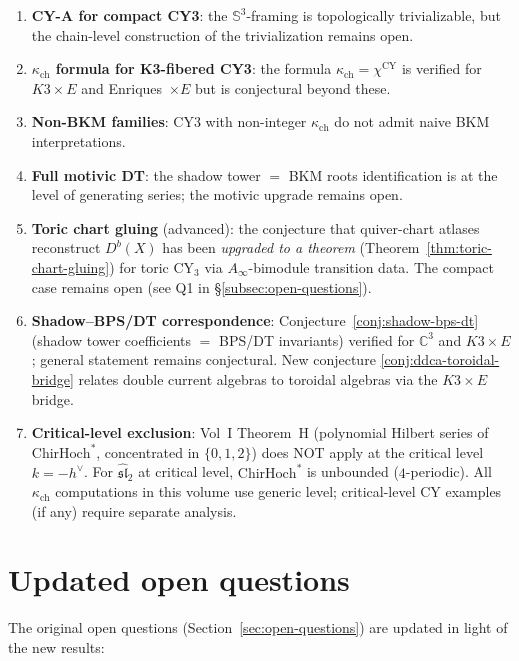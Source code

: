 \documentclass[11pt]{article}
\newcommand{\fsl}{\mathfrak{sl}}
\newcommand{\C}{\mathbb{C}}
\newcommand{\bS}{\mathbb{S}}
\newcommand{\CY}{\mathrm{CY}}
\newcommand{\ChirHoch}{\mathrm{ChirHoch}}
\begin{document}
\begin{enumerate}
 \item \textbf{CY-A for compact CY3}: the $\bS^3$-framing is topologically trivializable, but the chain-level construction of the trivialization remains open.
 \item \textbf{$\kappa_{\mathrm{ch}}$ formula for K3-fibered CY3}: the formula $\kappa_{\mathrm{ch}} = \chi^{\CY}$ is verified for $K3 \times E$ and Enriques~$\times E$ but is conjectural beyond these.
 \item \textbf{Non-BKM families}: CY3 with non-integer $\kappa_{\mathrm{ch}}$ do not admit naive BKM interpretations.
 \item \textbf{Full motivic DT}: the shadow tower $=$ BKM roots identification is at the level of generating series; the motivic upgrade remains open.
 \item \textbf{Toric chart gluing} (advanced): the conjecture that quiver-chart atlases reconstruct $D^b(X)$ has been \emph{upgraded to a theorem} (Theorem~\ref{thm:toric-chart-gluing}) for toric CY$_3$ via $A_\infty$-bimodule transition data. The compact case remains open (see Q1 in \S\ref{subsec:open-questions}).
 \item \textbf{Shadow--BPS/DT correspondence}: Conjecture~\ref{conj:shadow-bps-dt} (shadow tower coefficients $=$ BPS/DT invariants) verified for $\C^3$ and $K3 \times E$; general statement remains conjectural. New conjecture \ref{conj:ddca-toroidal-bridge} relates double current algebras to toroidal algebras via the $K3 \times E$ bridge.
 \item \textbf{Critical-level exclusion}: Vol~I Theorem~H (polynomial Hilbert series of $\ChirHoch^*$, concentrated in $\{0,1,2\}$) does NOT apply at the critical level $k = -h^\vee$. For $\widehat{\fsl}_2$ at critical level, $\ChirHoch^*$ is unbounded ($4$-periodic). All $\kappa_{\mathrm{ch}}$ computations in this volume use generic level; critical-level CY examples (if any) require separate analysis.
\end{enumerate}


\section{Updated open questions}
\label{sec:updated-open}

The original open questions (Section~\ref{sec:open-questions}) are updated in light of the new results:
\end{document}
